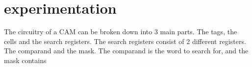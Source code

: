 \section{experimentation}
The circuitry of a CAM can be broken down into 3 main parts. The tags, the cells and the search registers. 
The search registers consist of 2 different registers. 
The comparand and the mask. The comparand is the word to search for, and the mask contains 